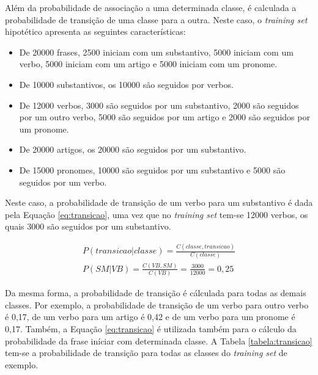 Além da probabilidade de associação a uma determinada classe, é calculada a
probabilidade de transição de uma classe para a outra. Neste caso, o
\textit{training set} hipotético apresenta as seguintes características:

\begin{itemize}
  \item De 20000 frases, 2500 iniciam com um substantivo, 5000 iniciam com um
  verbo, 5000 iniciam com um artigo e 5000 iniciam com um pronome.
  \item De 10000 substantivos, os 10000
  são seguidos por verbos.
  \item De 12000 verbos, 3000 são seguidos por um substantivo, 2000
  são seguidos por um outro verbo, 5000 são seguidos por um artigo e 2000 são
  seguidos por um pronome.
  \item De 20000 artigos, os 20000 são seguidos por um substantivo.
  \item De 15000 pronomes, 10000 são seguidos por um substantivo e 5000 são
  seguidos por um verbo.
  
  
\end{itemize}

Neste caso, a probabilidade de transição de um verbo para um substantivo é dada
pela Equação \ref{eq:transicao}, uma vez que no \textit{training set} tem-se
12000 verbos, os quais 3000 são seguidos por um substantivo.

\begin{equation}
\begin{split}
P(transicao|classe) = \frac{C(classe,transicao)}{C(classe)} \\
P(SM|VB) = \frac{C(VB,SM)}{C(VB)} = \frac{3000}{12000} = 0,25
\end{split}
\label{eq:transicao}
\end{equation}

Da mesma forma, a probabilidade de transição é cálculada para todas as
demais classes. Por exemplo, a probabilidade de
transição de um verbo para outro verbo é 0,17, de um verbo para um artigo é 0,42
e de um verbo para um pronome é 0,17. Também, a Equação \ref{eq:transicao} é
utilizada também para o cálculo da probabilidade da frase iníciar com
determinada classe.
A Tabela \ref{tabela:transicao} tem-se a probabilidade de transição para todas
as classes do \textit{training set} de exemplo.

